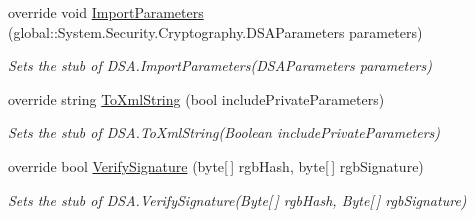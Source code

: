 \begin{DoxyCompactItemize}
override void \hyperlink{class_system_1_1_security_1_1_cryptography_1_1_fakes_1_1_stub_d_s_a_a3e55c4e1171b1095d4c84d16911c94f6}{Import\-Parameters} (global\-::\-System.\-Security.\-Cryptography.\-D\-S\-A\-Parameters parameters)
\begin{DoxyCompactList}\small\item\em Sets the stub of D\-S\-A.\-Import\-Parameters(\-D\-S\-A\-Parameters parameters)\end{DoxyCompactList}\item 
override string \hyperlink{class_system_1_1_security_1_1_cryptography_1_1_fakes_1_1_stub_d_s_a_aa3c9f30ffb36944f1cb6bd81c24feb91}{To\-Xml\-String} (bool include\-Private\-Parameters)
\begin{DoxyCompactList}\small\item\em Sets the stub of D\-S\-A.\-To\-Xml\-String(\-Boolean include\-Private\-Parameters)\end{DoxyCompactList}\item 
override bool \hyperlink{class_system_1_1_security_1_1_cryptography_1_1_fakes_1_1_stub_d_s_a_aa5087f167c348e3ada673ca299285443}{Verify\-Signature} (byte\mbox{[}$\,$\mbox{]} rgb\-Hash, byte\mbox{[}$\,$\mbox{]} rgb\-Signature)
\begin{DoxyCompactList}\small\item\em Sets the stub of D\-S\-A.\-Verify\-Signature(\-Byte\mbox{[}$\,$\mbox{]} rgb\-Hash, Byte\mbox{[}$\,$\mbox{]} rgb\-Signature)\end{DoxyCompactList}\end{DoxyCompactItemize}
